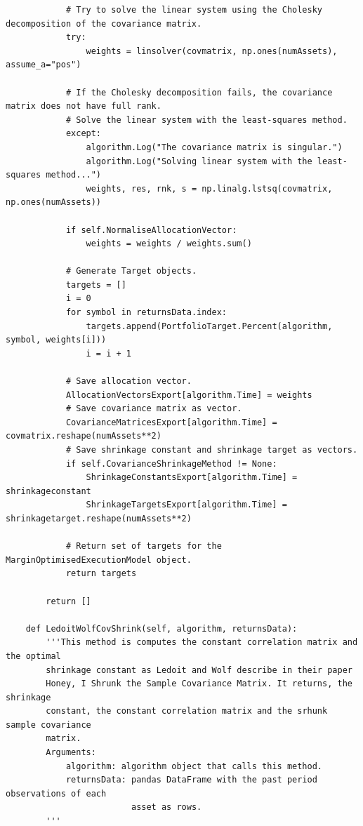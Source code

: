 \begin{verbatim}
            # Try to solve the linear system using the Cholesky decomposition of the covariance matrix.
            try:
                weights = linsolver(covmatrix, np.ones(numAssets), assume_a="pos")
                
            # If the Cholesky decomposition fails, the covariance matrix does not have full rank.
            # Solve the linear system with the least-squares method.
            except:
                algorithm.Log("The covariance matrix is singular.")
                algorithm.Log("Solving linear system with the least-squares method...")
                weights, res, rnk, s = np.linalg.lstsq(covmatrix, np.ones(numAssets))
                
            if self.NormaliseAllocationVector:
                weights = weights / weights.sum()
            
            # Generate Target objects.
            targets = []
            i = 0
            for symbol in returnsData.index:
                targets.append(PortfolioTarget.Percent(algorithm, symbol, weights[i]))
                i = i + 1
                
            # Save allocation vector.
            AllocationVectorsExport[algorithm.Time] = weights
            # Save covariance matrix as vector.
            CovarianceMatricesExport[algorithm.Time] = covmatrix.reshape(numAssets**2)
            # Save shrinkage constant and shrinkage target as vectors.
            if self.CovarianceShrinkageMethod != None:
                ShrinkageConstantsExport[algorithm.Time] = shrinkageconstant
                ShrinkageTargetsExport[algorithm.Time] = shrinkagetarget.reshape(numAssets**2)
            
            # Return set of targets for the MarginOptimisedExecutionModel object.
            return targets
            
        return []
        
    def LedoitWolfCovShrink(self, algorithm, returnsData):
        '''This method is computes the constant correlation matrix and the optimal
        shrinkage constant as Ledoit and Wolf describe in their paper
        Honey, I Shrunk the Sample Covariance Matrix. It returns, the shrinkage
        constant, the constant correlation matrix and the srhunk sample covariance
        matrix.
        Arguments:
            algorithm: algorithm object that calls this method.
            returnsData: pandas DataFrame with the past period observations of each
                         asset as rows.
        '''
        

\end{verbatim}
